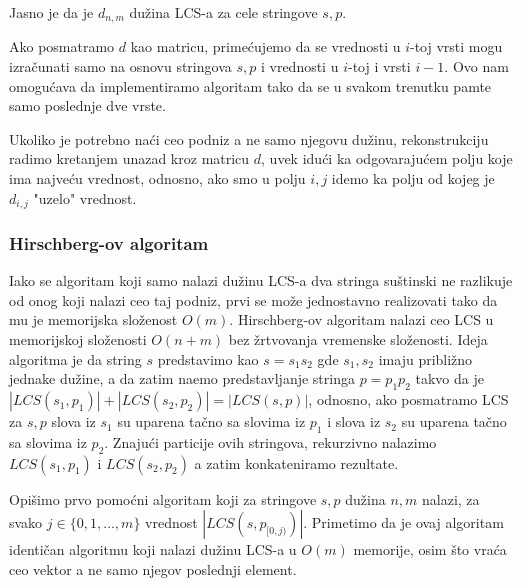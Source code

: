 Jasno je da je $d_{n,m}$ du\v zina LCS-a za cele stringove $s,p$.



Ako posmatramo $d$ kao matricu, prime\' cujemo da se vrednosti u $i$-toj vrsti mogu izra\v cunati samo na osnovu stringova $s,p$ i vrednosti u $i$-toj i vrsti $i-1$. Ovo nam omogu\' cava da implementiramo algoritam tako da se u svakom trenutku pamte samo poslednje dve vrste.

\noindent
\begin{minipage}[l]{\textwidth}

\end{minipage}

Ukoliko je potrebno na\' ci ceo podniz a ne samo njegovu du\v zinu, rekonstrukciju radimo kretanjem unazad kroz matricu $d$, uvek idu\' ci ka odgovaraju\' cem polju koje ima najve\' cu vrednost, odnosno, ako smo u polju $i,j$ idemo ka polju od kojeg je $d_{i,j}$ "uzelo" vrednost.



\subsubsection{Hirschberg-ov algoritam}

Iako se algoritam koji samo nalazi du\v zinu LCS-a dva stringa su\v stinski ne razlikuje od onog koji nalazi ceo taj podniz, prvi se mo\v ze jednostavno realizovati tako da mu je memorijska slo\v zenost $O(m)$. Hirschberg-ov algoritam nalazi ceo LCS u memorijskoj slo\v zenosti $O(n+m)$ bez \v zrtvovanja vremenske slo\v zenosti.\cite{hirschbergrad} Ideja algoritma je da string $s$ predstavimo kao $s=s_1s_2$ gde $s_1,s_2$ imaju pribli\v zno jednake du\v zine, a da zatim na\dj emo predstavljanje stringa $p=p_1p_2$ takvo da je $|LCS(s_1, p_1)| + |LCS(s_2, p_2)| = |LCS(s, p)|$, odnosno, ako posmatramo LCS za $s,p$ slova iz $s_1$ su uparena ta\v cno sa slovima iz $p_1$ i slova iz $s_2$ su uparena ta\v cno sa slovima iz $p_2$. Znaju\' ci particije ovih stringova, rekurzivno nalazimo $LCS(s_1, p_1)$ i $LCS(s_2, p_2)$ a zatim konkateniramo rezultate.

Opi\v simo prvo pomo\' cni algoritam koji za stringove $s,p$ du\v zina $n,m$ nalazi, za svako $j \in \{0, 1, \ldots, m\}$ vrednost $|LCS(s, p_{[0, j)})|$. Primetimo da je ovaj algoritam identi\v can algoritmu koji nalazi du\v zinu LCS-a u $O(m)$ memorije, osim \v sto vra\' ca ceo vektor a ne samo njegov poslednji element.

